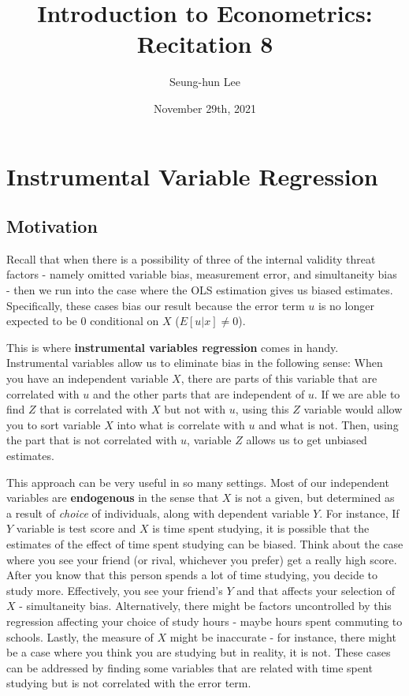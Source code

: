 \documentclass[12pt]{article}
\title{Introduction to Econometrics: Recitation 8}
\theoremstyle{definition}
\theoremstyle{property}
\theoremstyle{assumption}
\theoremstyle{example}
\theoremstyle{comment}
\begin{document}
\linespread{1.25}
\author{Seung-hun Lee}
\date{November 29th, 2021 }
\maketitle
\section{Instrumental Variable Regression}
\subsection{Motivation}
Recall that when there is a possibility of three of the internal validity threat factors - namely omitted variable bias, measurement error, and simultaneity bias - then we run into the case where the OLS estimation gives us biased estimates. Specifically, these cases bias our result because the error term $u$ is no longer expected to be 0 conditional on $X$ ($E[u|x]\neq 0$). \par\medskip

This is where \textbf{instrumental variables regression} comes in handy. Instrumental variables allow us to eliminate bias in the following sense: When you have an independent variable $X$, there are parts of this variable that are correlated with $u$ and the other parts that are independent of $u$. If we are able to find $Z$ that is correlated with $X$ but not with $u$, using this $Z$ variable would allow you to sort variable $X$ into what is correlate with $u$ and what is not. Then, using the part that is not correlated with $u$, variable $Z$ allows us to get unbiased estimates. \par\medskip

This approach can be very useful in so many settings. Most of our independent variables are \textbf{endogenous} in the sense that $X$ is not a given, but determined as a result of \textit{choice} of individuals, along with dependent variable $Y$. For instance, If $Y$ variable is test score and $X$ is time spent studying, it is possible that the estimates of the effect of time spent studying can be biased. Think about the case where you see your friend (or rival, whichever you prefer) get a really high score. After you know that this person spends a lot of time studying, you decide to study more. Effectively, you see your friend's $Y$ and that affects your selection of $X$ - simultaneity bias. Alternatively, there might be factors uncontrolled by this regression affecting your choice of study hours  - maybe hours spent commuting to schools. Lastly, the measure of $X$ might be inaccurate - for instance, there might be a case where you think you are studying but in reality, it is not. These cases can be addressed by finding some variables that are related with time spent studying but is not correlated with the error term. 
\end{document}
